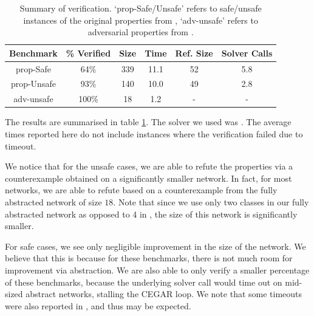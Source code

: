 \begin{table}
\footnotesize
\begin{tabular}{ |c|c|c|c|c|c| }
\hline
Benchmark   & \% Verified & Size     & Time    & Ref. Size  & Solver Calls \\ 
\hline
prop-Safe   &   64\%      & 339      & 11.1    & 52         & 5.8      \\
prop-Unsafe &   93\%      & 140      & 10.0    & 49         & 2.8      \\
adv-unsafe  &  100\%      & 18       & 1.2     & -          & -        \\
\hline                                                                
\end{tabular}
\caption{Summary of \acasxu verification. `prop-Safe/Unsafe' refers to
safe/unsafe instances of the original properties from \cite{reluplex},
`adv-unsafe' refers to adversarial properties from \cite{cegar-nn}. }
\label{t:acas-verif}
\end{table}

The results are summarised in table \ref{t:acas-verif}. The solver we used was
\abcrown. The average times reported here do not include instances where the
verification failed due to timeout.

We notice that for the unsafe cases, we are able to refute the
properties via a counterexample obtained on a significantly smaller network. In
fact, for most networks, we are able to refute based on a counterexample from
the fully abstracted network of size $18$. Note that since we use only two classes in our
fully abstracted network as opposed to 4 in \cite{cegar-nn}, the size of this
network is significantly smaller. 

For safe cases, we see only negligible improvement in the size of the network.
We believe that this is because for these benchmarks, there is not much room for
improvement via abstraction. We are also able to only verify a smaller
percentage of these benchmarks, because the underlying solver call would time
out on mid-sized abstract networks, stalling
the CEGAR loop. We note that some timeouts were also reported in
\cite{cegar-nn}, and thus may be expected.

